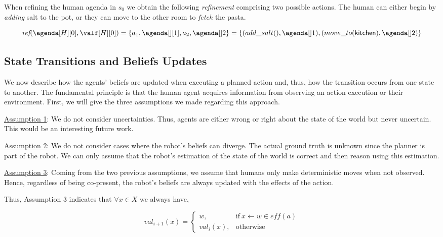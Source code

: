 When refining the human agenda in $s_0$ we obtain the following \textit{refinement} comprising two possible actions. The human can either begin by \textit{adding} salt to the pot, or they can move to the other room to \textit{fetch} the pasta. 

{\small
\begin{equation*}
    \textit{ref}(\agenda[H][0], \valf[H][0]) = \{ a_1,\agenda[][1], a_2,\agenda[]2 \}= \{ (add\_salt(),\agenda[]1), (move\_to(\textsf{kitchen}),\agenda[]2) \}
\end{equation*}
}

    \subsection{State Transitions and Beliefs Updates}

We now describe how the agents' beliefs are updated when executing a planned action and, thus, how the transition occurs from one state to another. The fundamental principle is that the human agent acquires information from observing an action execution or their environment. First, we will give the three assumptions we made regarding this approach.

\underline{Assumption 1}: We do not consider uncertainties. Thus, agents are either wrong or right about the state of the world but never uncertain. This would be an interesting future work. 

\underline{Assumption 2}: We do not consider cases where the robot's beliefs can diverge. The actual ground truth is unknown since the planner is part of the robot. We can only assume that the robot's estimation of the state of the world is correct and then reason using this estimation.

\underline{Assumption 3}: Coming from the two previous assumptions, we assume that humans only make deterministic moves when not observed. Hence, regardless of being co-present, the robot's beliefs are always updated with the effects of the action.


Thus, Assumption 3 indicates that $\forall x \in X$ we always have,

\begin{equation} \label{eq:apply_action_r}
    val_{i+1}(x) = \left\{ 
    \begin{array}{ll}
        w, & \mbox{if} ~ x \leftarrow w \in \textit{eff}(a)   \\ 
        val_i(x), & \mbox{otherwise}
    \end{array}\right.
\end{equation}

